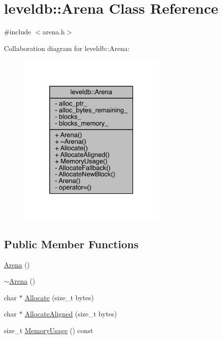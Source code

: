 \hypertarget{classleveldb_1_1_arena}{}\section{leveldb\+:\+:Arena Class Reference}
\label{classleveldb_1_1_arena}


{\ttfamily \#include $<$arena.\+h$>$}



Collaboration diagram for leveldb\+:\+:Arena\+:\nopagebreak
\begin{figure}[H]
\begin{center}
\leavevmode
\includegraphics[width=207pt]{classleveldb_1_1_arena__coll__graph}
\end{center}
\end{figure}
\subsection*{Public Member Functions}
\begin{DoxyCompactItemize}
\item 
\hyperlink{classleveldb_1_1_arena_a612fe3668024ddf7b92f632afa1361ca}{Arena} ()
\item 
\hyperlink{classleveldb_1_1_arena_a39130691c948dec339cd4649b39c965c}{$\sim$\+Arena} ()
\item 
char $\ast$ \hyperlink{classleveldb_1_1_arena_add4bc4b1c8fdf5be7a96a7ec00a0732e}{Allocate} (size\+\_\+t bytes)
\item 
char $\ast$ \hyperlink{classleveldb_1_1_arena_a9c1e8e695fe25ac96063f9fbacefee9e}{Allocate\+Aligned} (size\+\_\+t bytes)
\item 
size\+\_\+t \hyperlink{classleveldb_1_1_arena_aaf8db075d5d1130106bbbf66b1d267b2}{Memory\+Usage} () const 
\end{DoxyCompactItemize}
